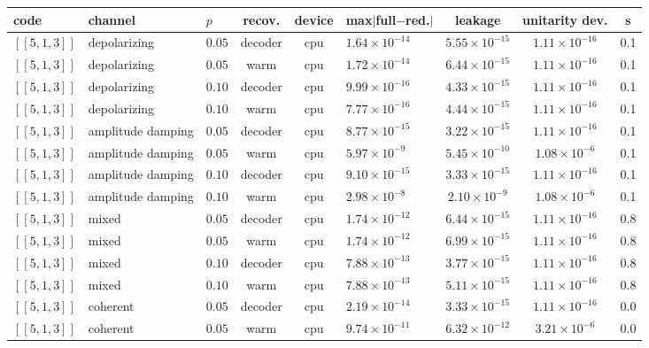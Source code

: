 \documentclass[10pt,a4paper]{article}
\begin{document}
\begin{longtable}{lllcclccc}
\toprule code & channel & $p$ & recov. & device & max$\lvert$full$-$red.$\rvert$ & leakage & unitarity dev. & s \\ \midrule
$[\![5,1,3]\!]$ & depolarizing & $0.05$ & decoder & cpu & $1.64\times 10^{-14}$ & $5.55\times 10^{-15}$ & $1.11\times 10^{-16}$ & 0.1 \\
$[\![5,1,3]\!]$ & depolarizing & $0.05$ & warm & cpu & $1.72\times 10^{-14}$ & $6.44\times 10^{-15}$ & $1.11\times 10^{-16}$ & 0.1 \\
$[\![5,1,3]\!]$ & depolarizing & $0.10$ & decoder & cpu & $9.99\times 10^{-16}$ & $4.33\times 10^{-15}$ & $1.11\times 10^{-16}$ & 0.1 \\
$[\![5,1,3]\!]$ & depolarizing & $0.10$ & warm & cpu & $7.77\times 10^{-16}$ & $4.44\times 10^{-15}$ & $1.11\times 10^{-16}$ & 0.1 \\
$[\![5,1,3]\!]$ & amplitude damping & $0.05$ & decoder & cpu & $8.77\times 10^{-15}$ & $3.22\times 10^{-15}$ & $1.11\times 10^{-16}$ & 0.1 \\
$[\![5,1,3]\!]$ & amplitude damping & $0.05$ & warm & cpu & $5.97\times 10^{-9}$ & $5.45\times 10^{-10}$ & $1.08\times 10^{-6}$ & 0.1 \\
$[\![5,1,3]\!]$ & amplitude damping & $0.10$ & decoder & cpu & $9.10\times 10^{-15}$ & $3.33\times 10^{-15}$ & $1.11\times 10^{-16}$ & 0.1 \\
$[\![5,1,3]\!]$ & amplitude damping & $0.10$ & warm & cpu & $2.98\times 10^{-8}$ & $2.10\times 10^{-9}$ & $1.08\times 10^{-6}$ & 0.1 \\
$[\![5,1,3]\!]$ & mixed & $0.05$ & decoder & cpu & $1.74\times 10^{-12}$ & $6.44\times 10^{-15}$ & $1.11\times 10^{-16}$ & 0.8 \\
$[\![5,1,3]\!]$ & mixed & $0.05$ & warm & cpu & $1.74\times 10^{-12}$ & $6.99\times 10^{-15}$ & $1.11\times 10^{-16}$ & 0.8 \\
$[\![5,1,3]\!]$ & mixed & $0.10$ & decoder & cpu & $7.88\times 10^{-13}$ & $3.77\times 10^{-15}$ & $1.11\times 10^{-16}$ & 0.8 \\
$[\![5,1,3]\!]$ & mixed & $0.10$ & warm & cpu & $7.88\times 10^{-13}$ & $5.11\times 10^{-15}$ & $1.11\times 10^{-16}$ & 0.8 \\
$[\![5,1,3]\!]$ & coherent & $0.05$ & decoder & cpu & $2.19\times 10^{-14}$ & $3.33\times 10^{-15}$ & $1.11\times 10^{-16}$ & 0.0 \\
$[\![5,1,3]\!]$ & coherent & $0.05$ & warm & cpu & $9.74\times 10^{-11}$ & $6.32\times 10^{-12}$ & $3.21\times 10^{-6}$ & 0.0 \\

\end{longtable}
\end{document}
